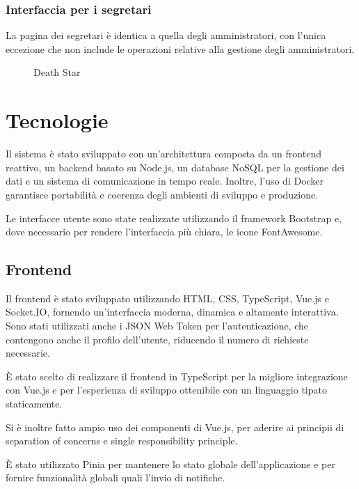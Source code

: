 \documentclass{report}
\begin{document}
\subsubsection{Interfaccia per i segretari}
\par La pagina dei segretari è identica a quella degli amministratori, con l'unica eccezione che non include le operazioni relative alla gestione degli amministratori.

\begin{figure}[h!]
\centering
\caption{Death Star}
\label{fig:deathstar}
\end{figure}

\section{Tecnologie}
\par Il sistema è stato sviluppato con un'architettura composta da un frontend reattivo, un backend basato su Node.js, un database NoSQL per la gestione dei dati e un sistema di comunicazione in tempo reale. Inoltre, l'uso di Docker garantisce portabilità e coerenza degli ambienti di sviluppo e produzione.
\par Le interfacce utente sono state realizzate utilizzando il framework Bootstrap e, dove necessario per rendere l'interfaccia più chiara, le icone FontAwesome.
\subsection{Frontend}
\par Il frontend è stato sviluppato utilizzando HTML, CSS, TypeScript, Vue.js e Socket.IO, fornendo un'interfaccia moderna, dinamica e altamente interattiva. Sono stati utilizzati anche i JSON Web Token per l'autenticazione, che contengono anche il profilo dell'utente, riducendo il numero di richieste necessarie.
\par È stato scelto di realizzare il frontend in TypeScript per la migliore integrazione con Vue.js e per l'esperienza di sviluppo ottenibile con un linguaggio tipato staticamente.
\par Si è inoltre fatto ampio uso dei componenti di Vue.js, per aderire ai principii di separation of concerns e single responsibility principle.
\par È stato utilizzato Pinia per mantenere lo stato globale dell'applicazione e per fornire funzionalità globali quali l'invio di notifiche.
\end{document}
